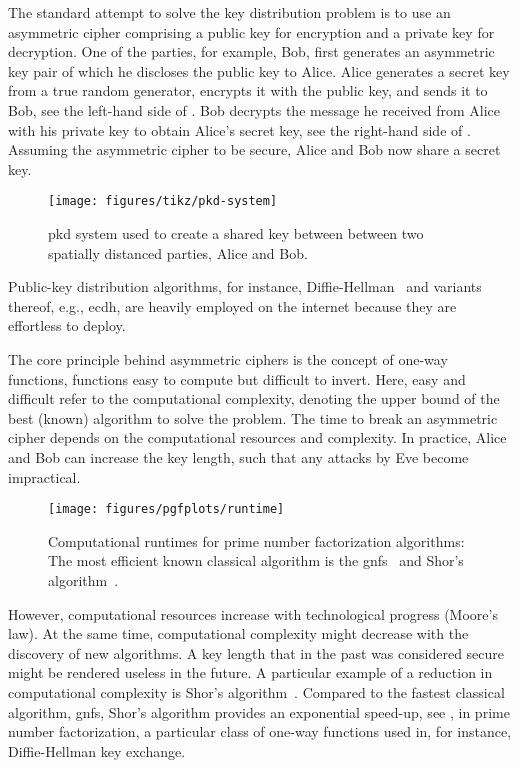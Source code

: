 The standard attempt to solve the key distribution problem is to use an asymmetric cipher comprising a public key for encryption and a private key for decryption.
One of the parties, for example, Bob, first generates an asymmetric key pair of which he discloses the public key to Alice.
Alice generates a secret key from a true random generator, encrypts it with the public key, and sends it to Bob, see the left-hand side of .
Bob decrypts the message he received from Alice with his private key to obtain Alice's secret key, see the right-hand side of .
Assuming the asymmetric cipher to be secure, Alice and Bob now share a secret key.
\begin{figure}[htb]
	\centering
	\texttt{[image: figures/tikz/pkd-system]}
	\caption{\Gls{pkd} system used to create a shared key between between two spatially distanced parties, Alice and Bob.}\label{fig:pkd_system}
\end{figure}
Public-key distribution algorithms, for instance, Diffie-Hellman~\cite{Diffie1976} and variants thereof, e.g., \gls{ecdh}, are heavily employed on the internet because they are effortless to deploy.

The core principle behind asymmetric ciphers is the concept of one-way functions, functions easy to compute but difficult to invert.
Here, easy and difficult refer to the computational complexity, denoting the upper bound of the best (known) algorithm to solve the problem.
The time to break an asymmetric cipher depends on the computational resources and complexity.
In practice, Alice and Bob can increase the key length, such that any attacks by Eve become impractical.
\begin{figure}[htb]
	\centering
	\texttt{[image: figures/pgfplots/runtime]}
	\caption{Computational runtimes for prime number factorization algorithms: The most efficient known classical algorithm is the \gls{gnfs}~\cite{Lenstra1993} and Shor's algorithm~\cite{Shor1994}.}
	\label{fig:prime_number_factorization_runtime}
\end{figure}
However, computational resources increase with technological progress (Moore's law).
At the same time, computational complexity might decrease with the discovery of new algorithms.
A key length that in the past was considered secure might be rendered useless in the future.
A particular example of a reduction in computational complexity is Shor's algorithm~\cite{Shor1994}.
Compared to the fastest classical algorithm, \gls{gnfs}, Shor's algorithm provides an exponential speed-up, see , in prime number factorization, a particular class of one-way functions used in, for instance, Diffie-Hellman key exchange.


